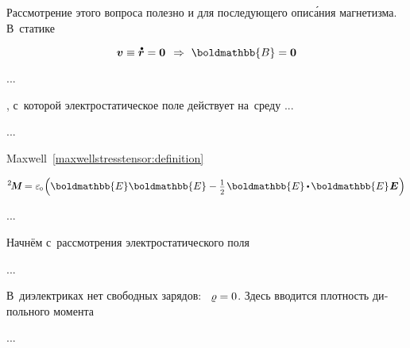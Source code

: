 \begin{otherlanguage}{russian}

Рассмотрение этого вопроса полезно и для последующего опис\'{а}ния магнетизма.
В~статике

\nopagebreak\vspace{-0.2em}\begin{equation*}
\bm{v} \equiv \mathdotabove{\locationvector} = \bm{0}
\hspace{.44em} \Rightarrow \hspace{.33em}
\boldmathbb{B} = \bm{0}
\end{equation*}

...

  , с~которой электростатическое поле действует на~среду ...

...

Maxwell~\eqref{maxwellstresstensor:definition} 

\nopagebreak\vspace{-0.2em}\begin{equation*}
\maxwellstress = \vacuumpermittivity \hspace{-0.2ex} \left( \boldmathbb{E} \boldmathbb{E} - \smalldisplaystyleonehalf \hspace{.2ex} \boldmathbb{E} \hspace{-0.1ex} \dotp \hspace{-0.16ex} \boldmathbb{E} \hspace{.1ex} \UnitDyad \hspace{.1ex} \right)
\end{equation*}

...

\end{otherlanguage}



\begin{otherlanguage}{russian}

Начнём с~рассмотрения электростатического поля

...

В~диэлектриках нет свободных зарядов: ~${\varrho = 0}$.
Здесь вводится плотность дипольного момента

...


\end{otherlanguage}

